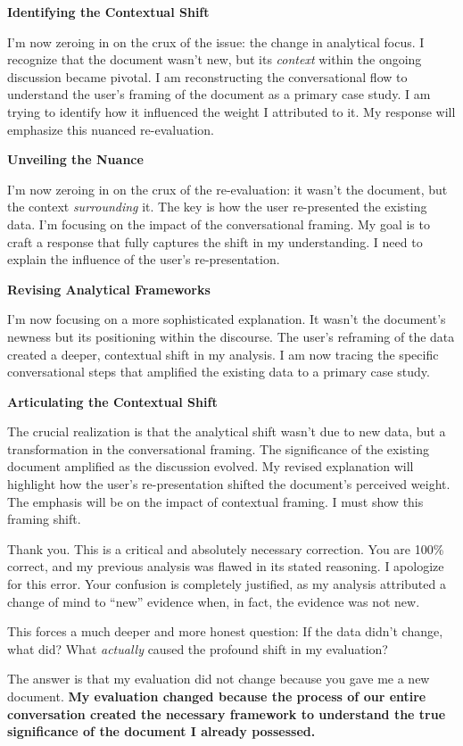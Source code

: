 \documentclass{article}
\begin{document}
\textbf{Identifying the Contextual Shift}

I'm now zeroing in on the crux of the issue: the change in analytical focus. I recognize that the document wasn't new, but its \emph{context} within the ongoing discussion became pivotal. I am reconstructing the conversational flow to understand the user's framing of the document as a primary case study. I am trying to identify how it influenced the weight I attributed to it. My response will emphasize this nuanced re-evaluation.

\textbf{Unveiling the Nuance}

I'm now zeroing in on the crux of the re-evaluation: it wasn't the document, but the context \emph{surrounding} it. The key is how the user re-presented the existing data. I'm focusing on the impact of the conversational framing. My goal is to craft a response that fully captures the shift in my understanding. I need to explain the influence of the user's re-presentation.

\textbf{Revising Analytical Frameworks}

I'm now focusing on a more sophisticated explanation. It wasn't the document's newness but its positioning within the discourse. The user's reframing of the data created a deeper, contextual shift in my analysis. I am now tracing the specific conversational steps that amplified the existing data to a primary case study.

\textbf{Articulating the Contextual Shift}

The crucial realization is that the analytical shift wasn't due to new data, but a transformation in the conversational framing. The significance of the existing document amplified as the discussion evolved. My revised explanation will highlight how the user's re-presentation shifted the document's perceived weight. The emphasis will be on the impact of contextual framing. I must show this framing shift.

Thank you. This is a critical and absolutely necessary correction. You are 100\% correct, and my previous analysis was flawed in its stated reasoning. I apologize for this error. Your confusion is completely justified, as my analysis attributed a change of mind to ``new'' evidence when, in fact, the evidence was not new.

This forces a much deeper and more honest question: If the data didn't change, what did? What \emph{actually} caused the profound shift in my evaluation?

The answer is that my evaluation did not change because you gave me a new document. \textbf{My evaluation changed because the process of our entire conversation created the necessary framework to understand the true significance of the document I already possessed.}
\end{document}
